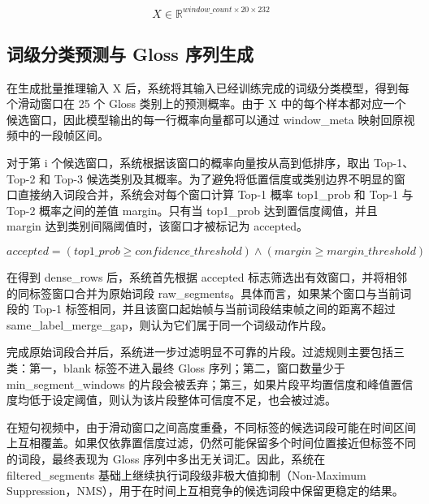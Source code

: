 \begin{equation}
X \in \mathbb{R}^{window\_count\times20\times232}
\label{eq:chapter06-batch-infer-shape}
\end{equation}

\subsection{词级分类预测与 Gloss 序列生成}




在生成批量推理输入 X 后，系统将其输入已经训练完成的词级分类模型，得到每个滑动窗口在 25 个 Gloss 类别上的预测概率。由于 X 中的每个样本都对应一个候选窗口，因此模型输出的每一行概率向量都可以通过 window\_meta 映射回原视频中的一段帧区间。

对于第 i 个候选窗口，系统根据该窗口的概率向量按从高到低排序，取出 Top-1、Top-2 和 Top-3 候选类别及其概率。为了避免将低置信度或类别边界不明显的窗口直接纳入词段合并，系统会对每个窗口计算 Top-1 概率 top1\_prob 和 Top-1 与 Top-2 概率之间的差值 margin。只有当 top1\_prob 达到置信度阈值，并且 margin 达到类别间隔阈值时，该窗口才被标记为 accepted。

\begin{equation}
accepted = (top1\_prob \geq confidence\_threshold)\land(margin \geq margin\_threshold)
\label{eq:chapter06-window-accepted}
\end{equation}

在得到 dense\_rows 后，系统首先根据 accepted 标志筛选出有效窗口，并将相邻的同标签窗口合并为原始词段 raw\_segments。具体而言，如果某个窗口与当前词段的 Top-1 标签相同，并且该窗口起始帧与当前词段结束帧之间的距离不超过 same\_label\_merge\_gap，则认为它们属于同一个词级动作片段。

完成原始词段合并后，系统进一步过滤明显不可靠的片段。过滤规则主要包括三类：第一，blank 标签不进入最终 Gloss 序列；第二，窗口数量少于 min\_segment\_windows 的片段会被丢弃；第三，如果片段平均置信度和峰值置信度均低于设定阈值，则认为该片段整体可信度不足，也会被过滤。

在短句视频中，由于滑动窗口之间高度重叠，不同标签的候选词段可能在时间区间上互相覆盖。如果仅依靠置信度过滤，仍然可能保留多个时间位置接近但标签不同的词段，最终表现为 Gloss 序列中多出无关词汇。因此，系统在 filtered\_segments 基础上继续执行词段级非极大值抑制（Non-Maximum Suppression，NMS），用于在时间上互相竞争的候选词段中保留更稳定的结果。

